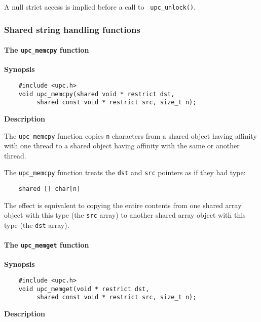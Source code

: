 \np A null strict access is implied before a call to {\tt
    upc\_unlock()}.

\subsubsection{Shared string handling functions}

\paragraph{The {\tt upc\_memcpy} function}

{\bf Synopsis} 

\npf\vspace{-2.5em}
\begin{verbatim}
    #include <upc.h> 
    void upc_memcpy(shared void * restrict dst, 
         shared const void * restrict src, size_t n); 
\end{verbatim}

{\bf Description}

\np The {\tt upc\_memcpy} function copies {\tt n} characters
  from a shared object having affinity with one thread to a shared object
  having affinity with the same or another thread.

\np The {\tt upc\_memcpy} function treats the {\tt dst} and
   {\tt src} pointers as if they had type:

\begin{verbatim}
    shared [] char[n] 
\end{verbatim}

   The effect is equivalent to copying the entire contents from one
   shared array object with this type (the {\tt src} array) to another shared
   array object with this type (the {\tt dst} array).

\paragraph{The {\tt upc\_memget} function}

{\bf Synopsis} 

\npf\vspace{-2.5em}
\begin{verbatim}
    #include <upc.h> 
    void upc_memget(void * restrict dst, 
         shared const void * restrict src, size_t n); 
\end{verbatim}

{\bf Description}

